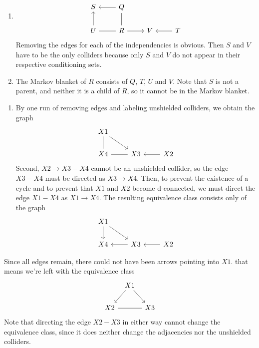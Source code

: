 \documentclass{article}
\begin{document}
\begin{ex}
\begin{enumerate}
\item
\begin{equation*}
\begin{tikzcd}
S
  &
Q \ar{l}
  \ar[-]{d}
  \\
U \ar{u}
  \ar[-]{r}
  &
R \ar{r}
  &
V
  &
T \ar{l}
\end{tikzcd}
\end{equation*}
Removing the edges for each of the independencies is obvious. Then $S$ and $V$ 
have to be the only colliders because only $S$ and $V$ do not appear in their
respective conditioning sets.
\item The Markov blanket of $R$ consists of $Q$, $T$, $U$ and $V$. Note that
$S$ is not a parent, and neither it is a child of $R$, so it cannot be in the
Markov blanket.
\end{enumerate}
\end{ex}

\begin{ex}
\begin{enumerate}
\item By one run of removing edges and labeling unshielded colliders, we obtain
the graph
\begin{equation*}
\begin{tikzcd}
X1 
  \ar[-]{d}
  \ar{dr}
  \\
X4 \ar[-]{r}
  &
X3 
  &
X2
  \ar{l}
\end{tikzcd}
\end{equation*}
Second, $X2\to X3 - X4$ cannot be an unshielded collider, so the edge $X3-X4$
must be directed as $X3\to X4$. Then, to prevent the existence of a cycle
and to prevent that $X1$ and $X2$ become d-connected, we must direct the
edge $X1-X4$ as $X1\to X4$. The resulting equivalence class consists only of
the graph
\begin{equation*}
\begin{tikzcd}
X1 
  \ar{d}
  \ar{dr}
  \\
X4 
  &
X3 \ar{l}
  &
X2
  \ar{l}
\end{tikzcd}
\end{equation*}
\end{enumerate}
\end{ex}

\begin{ex}
Since all edges remain, there could not have been arrows pointing into $X1$.
that means we're left with the equivalence class
\begin{equation*}
\begin{tikzcd}[column sep=tiny]
{} & X1 \ar{dl} \ar{dr}
  \\
X2 \ar[-]{rr}
  & &
X3
\end{tikzcd}
\end{equation*}
Note that directing the edge $X2-X3$ in either way cannot change the equivalence
class, since it does neither change the adjacencies nor the unshielded colliders.
\end{ex}
\end{document}
